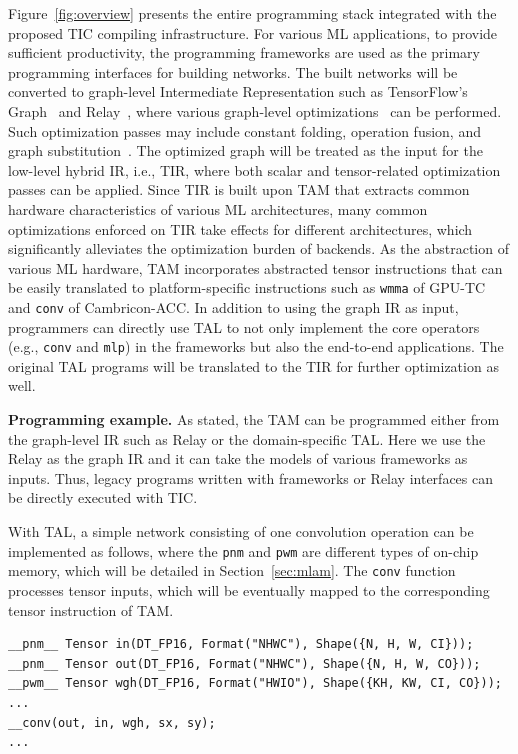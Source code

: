 Figure~\ref{fig:overview} presents the entire programming stack integrated with the proposed TIC compiling infrastructure. For various ML applications, to provide sufficient productivity, the programming frameworks are used as the primary programming interfaces for building networks. The built networks will be converted to graph-level Intermediate Representation such as TensorFlow's Graph~\cite{abadi2016tensorflow} and Relay~\cite{roesch2018relay}, where various graph-level optimizations~\cite{tensorflow2016xla} can be performed. Such optimization passes may include constant folding, operation fusion, and graph substitution~\cite{jia2019taso}. The optimized graph will be treated as the input for the low-level hybrid IR, i.e., TIR, where both scalar and tensor-related optimization passes can be applied.  Since TIR is built upon TAM that extracts common hardware characteristics of various ML architectures, many common optimizations enforced on TIR take effects for different architectures, which significantly alleviates the optimization burden of backends. As the abstraction of various ML hardware, TAM incorporates abstracted tensor instructions that can be easily translated to platform-specific instructions such as \texttt{wmma} of GPU-TC and \texttt{conv} of Cambricon-ACC. In addition to using the graph IR as input, programmers can directly use TAL to not only implement the core operators (e.g., \texttt{conv} and \texttt{mlp}) in the frameworks but also the end-to-end applications. The original TAL programs will be translated to the TIR for further optimization as well.

\textbf{Programming example.} As stated, the TAM can be programmed either from the graph-level IR such as Relay or the domain-specific TAL. Here we use the Relay as the graph IR and it can take the models of various frameworks as inputs. Thus, legacy programs written with frameworks or Relay interfaces can be directly executed with TIC.


With TAL, a simple network consisting of one convolution operation can be implemented as follows, where the \texttt{pnm} and \texttt{pwm} are different types of on-chip memory, which will be detailed in Section~\ref{sec:mlam}. The \texttt{conv} function processes tensor inputs, which will be eventually mapped to the corresponding tensor instruction of TAM.

\vspace{-8pt}
\begin{scriptsize}
\begin{verbatim}
__pnm__ Tensor in(DT_FP16, Format("NHWC"), Shape({N, H, W, CI}));
__pnm__ Tensor out(DT_FP16, Format("NHWC"), Shape({N, H, W, CO}));
__pwm__ Tensor wgh(DT_FP16, Format("HWIO"), Shape({KH, KW, CI, CO}));
...
__conv(out, in, wgh, sx, sy);
...
\end{verbatim}
\end{scriptsize}
\vspace{-15pt}

